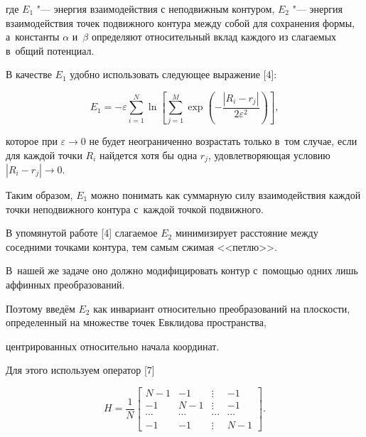где $E_{1} $ "--- энергия взаимодействия с неподвижным контуром, $E_{2} $ "--- энергия взаимодействия точек подвижного контура между собой для сохранения формы, а~константы $\alpha $ и~$\beta $ определяют относительный вклад каждого из слагаемых в~общий потенциал.



В качестве $E_{1} $ удобно использовать следующее выражение [4]:

\begin{equation} \label{GrindEQ__2_}

E_{1} =-\varepsilon \sum _{i=1}^{N}\ln \left[\sum _{j=1}^{M}\exp \left(-\frac{\left|R_{i} -r_{j} \right|}{2\varepsilon ^{2} } \right) \right] ,

\end{equation}

которое при $\varepsilon \to 0$ не будет неограниченно возрастать только в~том случае, если для каждой точки $R_{i} $ найдется хотя бы одна $r_{j} $, удовлетворяющая условию $\left|R_{i} -r_{j} \right|\to 0$.

Таким образом, $E_{1} $ можно понимать как суммарную силу взаимодействия каждой точки неподвижного контура с~каждой точкой подвижного.



В упомянутой работе [4] слагаемое $E_{2} $ минимизирует расстояние между соседними точками контура, тем самым сжимая <<петлю>>.

В~нашей же задаче оно должно модифицировать контур с~помощью одних лишь аффинных преобразований.

Поэтому введём $E_{2} $ как инвариант относительно преобразований на плоскости, определенный на множестве точек Евклидова пространства,

центрированных относительно начала координат.

Для этого используем оператор [7]

\[H=

\frac{1}{N}

\left[\begin{array}{cccc} {N-1} & {-1} & {\vdots} & {-1} \\

{-1} & {N-1} & {\vdots} & {-1} \\

{\cdots} & {\cdots} & {\cdots} & {\cdots} \\

{-1} & {-1} & {\vdots} & {N-1} \end{array}\right]. \]



